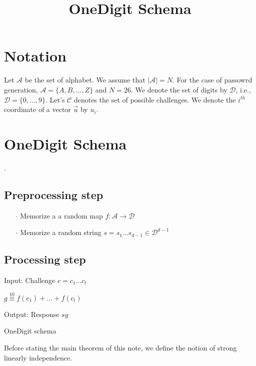 \documentclass{article}
\title{\LARGE OneDigit Schema}
\author{}
\newenvironment{alg}{
    \begin{list}{}{
        \setlength{\itemsep}{2pt}
        \setlength{\parsep}{0pt}
        \setlength{\parskip}{0pt}
        \setlength{\topsep}{1pt}
    }
}
{
    \end{list}
}
\begin{document}
\maketitle

\section{Notation}
Let $\mathcal{A}$ be the set of alphabet. We assume that $|\mathcal{A}|=N$. For the case of passowrd generation, $\mathcal{A}=\{A,B,\ldots,Z\}$ and $N=26$. We denote the set of digits by $\mathcal{D}$, i.e., $\mathcal{D}=\{0,\ldots,9\}$. Let's $\mathcal{C}$ denotes the set of possible challenges. We denote the $i^{th}$ coordinate of a vector $\vec{u}$ by $u_i$. 

\section{OneDigit Schema}. 

\subsection{Preprocessing step}
\begin{itemize}
	\item[$\cdot$] Memorize a a random map $f:\mathcal{A} \to \mathcal{D}$
	\item[$\cdot$] Memorize a random string $s = s_1 \ldots s_{d-1}\in \mathcal{D}^{d-1}$
\end{itemize}

\subsection{Processing step}

\begin{algorithm}
\label{OneDigit}
\begin{alg}
\item[] Input: Challenge $c=c_1 \ldots c_l$
\item[] $g \overset{10}{\equiv} f(c_1)+\ldots +f(c_l)$
\item[] Output: Response $sg$
\label{alg:NotKnown}
\end{alg}
\caption{OneDigit schema}
\end{algorithm}

Before stating the main theorem of this note, we define the notion of strong linearly independence.
\end{document}
